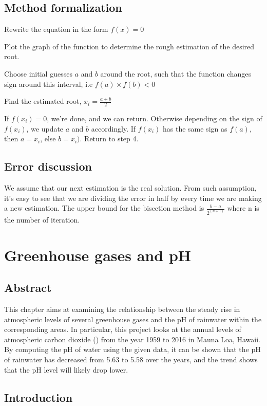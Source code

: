\documentclass[openany]{book}
\begin{document}
	\section{Method formalization}
	\begin{steps}
		\item Rewrite the equation in the form ${f(x) = 0}$
		\item Plot the graph of the function to determine the rough estimation of the desired root.
		\item Choose initial guesses ${a}$ and ${b}$ around the root, such that the function changes sign around this interval, i.e ${f(a) \times f(b)<0}$
		\item Find the estimated root, ${x_i = \frac{a + b}{2}}$
		\item If ${f(x_i) = 0}$, we're done, and we can return. Otherwise depending on the sign of ${f(x_i)}$, we update ${a}$ and ${b}$ accordingly. If ${f(x_i)}$ has the same sign as ${f(a)}$, then ${a = x_i}$, else ${b = x_i)}$. Return to step 4.
	\end{steps}
	\section{Error discussion}
	We assume that our next estimation is the real solution. From such assumption, it's easy to see that we are dividing the error in half by every time we are making a new estimation. The upper bound for the bisection method is ${\frac{b - a}{2^(n+1)}}$ where n is the number of iteration.
	\chapter{Greenhouse gases and pH}
	\section{Abstract}
	This chapter aims at examining the relationship between the steady 	rise in atmospheric levels of several greenhouse gases and the pH of rainwater within the corresponding areas. In particular, this project looks at the annual levels of atmospheric carbon dioxide () from the year 1959 to 2016 in Mauna Loa, Hawaii. By computing the pH of water using the given data, it can be shown that the pH of rainwater has decreased from 5.63 to 5.58 over the years, and the trend shows that the pH level will likely drop lower.
	
	\section{Introduction}
	
\end{document}

